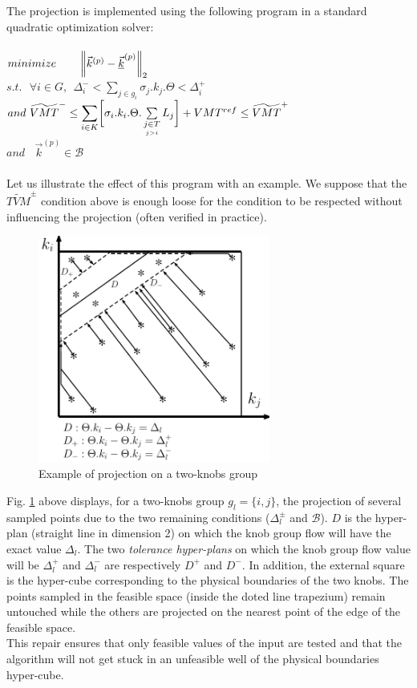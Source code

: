 The projection is implemented using the following program in a standard quadratic optimization solver:\\
\\
$minimize \ \ \ \ \ \ \norm{\vec{k}^{(p)}-\underline{\vec{k}}^{(p)}}_{2}$\\
$s.t.\ \ \ \forall i\in{G}, \ \ \Delta_{i}^{-}< \sum_{j\in{g_{i}}} \sigma_{j}.k_{j}.\Theta<\Delta_{i}^{+}$\\
$and\ \widetilde{VMT}^{-}\leq\mathlarger{\sum\limits_{i\in K}}\biggl[\sigma_{i}.k_{i}.\Theta.	\sum\limits_{\underset{j>i}{j\in T}}L_{j}\biggr]+VMT^{ref}\leq \widetilde{VMT}^{+}\nonumber $\\
$and\ \ \ \ \vec{k}^{(p)}\in \mathscr{B}$\\
\\
Let us illustrate the effect of this program with an example. We suppose that the $\widetilde{TVM}^{\pm}$ condition above is enough loose for the condition to be respected without influencing the projection (often verified in practice).
\begin{figure}[h!]
\centering
\includegraphics[width=3in]{figures/proj.pdf}
\caption{Example of projection on a two-knobs group}
\label{fig:proj}
\end{figure}
Fig. \ref{fig:proj} above displays, for a two-knobs group $g_{l}=\{i,j\}$, the projection of several sampled points due to the two remaining conditions ($\Delta_{l}^{\pm}$ and $\mathscr{B}$). $D$ is the hyper-plan (straight line in dimension 2) on which the knob group flow will have the exact value $\Delta_{l}$.
The two \emph{tolerance hyper-plans} on which the knob group flow value will be $\Delta_{l}^{+}$ and $\Delta_{l}^{-}$ are respectively $D^{+}$ and $D^{-}$.
In addition, the external square is the hyper-cube corresponding to the physical boundaries of the two knobs. 
The points sampled in the feasible space (inside the doted line trapezium) remain untouched while the others are projected on the nearest point of the edge of the feasible space.\\
This repair ensures that only feasible values of the input are tested and that the algorithm will not get stuck in an unfeasible well of the physical boundaries hyper-cube.\\

